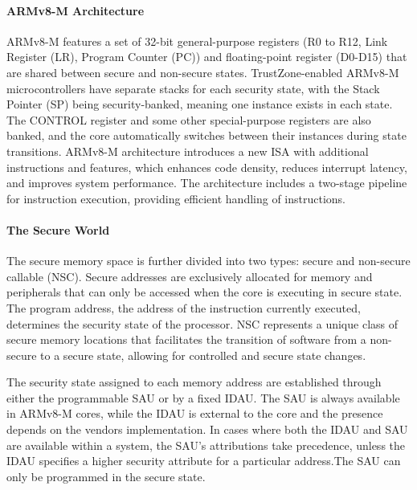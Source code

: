 \paragraph{\textbf{ARMv8-M Architecture}}
%
ARMv8-M features a set of 32-bit
general-purpose registers (R0 to R12, Link Register (LR), Program Counter
(PC)) and floating-point register (D0-D15) that are shared between secure
and non-secure states. TrustZone-enabled ARMv8-M microcontrollers have
separate stacks for each security state, with the Stack Pointer (SP) being
security-banked, meaning one instance exists in each state. The CONTROL
register and some other special-purpose registers are also banked, and the
core automatically switches between their instances during state
transitions. ARMv8-M architecture introduces a new ISA with additional
instructions and features, which enhances code density, reduces interrupt
latency, and improves system performance. The architecture includes a
two-stage pipeline for instruction execution, providing efficient handling
of instructions.

\paragraph{\textbf{The Secure World}}
%
The secure memory space is further divided into two types: secure and
non-secure callable (\ac{NSC}). Secure addresses are exclusively allocated
for memory and peripherals that can only be accessed when the core is
executing in secure state. The program address, the address of the
instruction currently executed, determines the security state of the
processor.
\ac{NSC} represents a unique class of secure memory locations that
facilitates the transition of software from a non-secure to a secure state,
allowing for controlled and secure state changes. 

The security state assigned to each memory address are established through
either the programmable \ac{SAU} or by a fixed \ac{IDAU}. The \ac{SAU} is
always available in ARMv8-M cores, while the \ac{IDAU} is external to the
core and the presence depends on the vendors implementation. In cases where
both the \ac{IDAU} and \ac{SAU} are available within a system, the
\ac{SAU}'s attributions take precedence, unless the \ac{IDAU} specifies a
higher security attribute for a particular address.The \ac{SAU} can only be
programmed in the secure state. 

